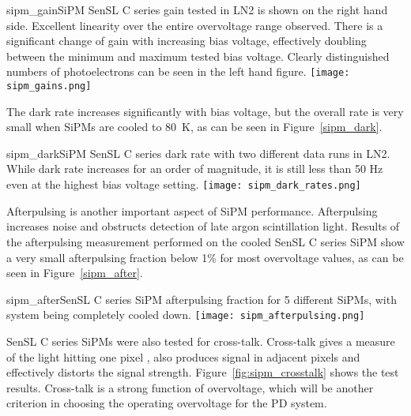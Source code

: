 \begin{cdrfigure}{sipm_gain}{SiPM SenSL C series gain tested in LN2 is
    shown on the right hand side. Excellent linearity over the entire
    overvoltage range observed. There is a significant change of gain
    with increasing bias voltage, effectively doubling between the
    minimum and maximum tested bias voltage. Clearly distinguished
    numbers of photoelectrons can be seen in the left hand figure.}    
  \texttt{[image: sipm\_gains.png]}
\end{cdrfigure}

The dark rate increases significantly with bias voltage, but the
overall rate is very small when SiPMs are cooled to 80~K, as can
be seen in Figure~\ref{sipm_dark}.

\begin{cdrfigure}{sipm_dark}{SiPM SenSL C series dark rate with
    two different data runs in LN2. While dark rate increases for an
    order of magnitude, it is still less than 50 Hz even at the
    highest bias voltage setting.}     
  \texttt{[image: sipm\_dark\_rates.png]}
\end{cdrfigure}

Afterpulsing is another important aspect of SiPM
performance. Afterpulsing increases noise and obstructs detection of
late argon scintillation light. Results of the afterpulsing
measurement performed on the cooled SenSL C series SiPM show a
very small afterpulsing fraction below 1\% for most overvoltage
values, as can be seen in Figure~\ref{sipm_after}.

\begin{cdrfigure}{sipm_after}{SenSL C series SiPM afterpulsing fraction for 5
    different SiPMs, with system being completely cooled down.}      
  \texttt{[image: sipm\_afterpulsing.png]}
\end{cdrfigure}

SenSL C series SiPMs were also tested for cross-talk. Cross-talk gives
a measure of the light hitting one pixel , also produces signal in
adjacent pixels and effectively distorts the signal
strength. Figure~\ref{fig:sipm_crosstalk} shows the test
results. Cross-talk is a strong function of overvoltage, which will be
another criterion in choosing the operating overvoltage for the PD
system.

